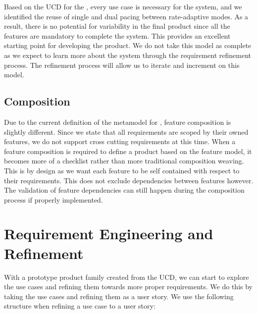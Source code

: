 Based on the UCD for the \pgd, every use case is necessary for the system, and we identified the reuse of single and dual pacing between rate-adaptive modes. As a result, there is no potential for variability in the final product since all the features are mandatory to complete the system. This provides an excellent starting point for developing the product. We do not take this model as complete as we expect to learn more about the system through the requirement refinement process. The refinement process will allow us to iterate and increment on this model.

\subsection{Composition}

Due to the current definition of the metamodel for \tool, feature composition is slightly different. Since we state that all requirements are scoped by their owned features, we do not support cross cutting requirements at this time. When a feature composition is required to define a product based on the feature model, it becomes more of a checklist rather than more traditional composition weaving. This is by design as we want each feature to be self contained with respect to their requirements. This does not exclude dependencies between features however. The validation of feature dependencies can still happen during the composition process if properly implemented.

\section{Requirement Engineering and Refinement}

With a prototype product family created from the UCD, we can start to explore the use cases and refining them towards more proper requirements. We do this by taking the use cases and refining them as a user story. We use the following structure when refining a use case to a user story:

